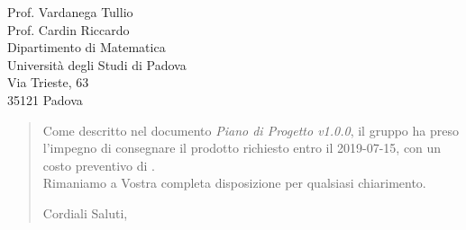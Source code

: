 \begin{letter}{
		Prof. Vardanega Tullio \\
		Prof. Cardin Riccardo \\
		Dipartimento di Matematica \\
		Università degli Studi di Padova \\
		Via Trieste, 63 \\
		35121 Padova}
\begin{quotation}
\noindent Come descritto nel documento \textit{Piano di Progetto v1.0.0}, il gruppo ha preso l'impegno di consegnare il prodotto richiesto entro il 2019-07-15, con un costo preventivo di  \textbf{}.\\
Rimaniamo a Vostra completa disposizione per qualsiasi chiarimento.

\vspace{0.5cm}
\closing{ Cordiali Saluti,}
	

\end{quotation}
		
\end{letter}


